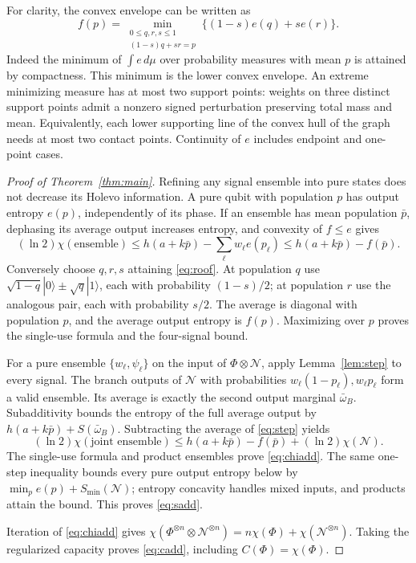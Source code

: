 \documentclass[11pt]{article}
\newcommand{\Smin}{S_{\min}}
\begin{document}
For clarity, the convex envelope can be written as
\begin{equation}\label{eq:roof}
 f(p)=\min_{\substack{0\le q,r,s\le1\\(1-s)q+sr=p}}
       \{(1-s)e(q)+se(r)\}.
\end{equation}
Indeed the minimum of $\int e\,d\mu$ over probability measures with mean $p$ is attained by compactness. This minimum is the lower convex envelope. An extreme minimizing measure has at most two support points: weights on three distinct support points admit a nonzero signed perturbation preserving total mass and mean. Equivalently, each lower supporting line of the convex hull of the graph needs at most two contact points. Continuity of $e$ includes endpoint and one-point cases.

\begin{proof}[Proof of Theorem~\ref{thm:main}]
Refining any signal ensemble into pure states does not decrease its Holevo information. A pure qubit with population $p$ has output entropy $e(p)$, independently of its phase. If an ensemble has mean population $\bar p$, dephasing its average output increases entropy, and convexity of $f\le e$ gives
\[
 (\ln2)\chi(\text{ensemble})
 \le h(a+k\bar p)-\sum_\ell w_\ell e(p_\ell)
 \le h(a+k\bar p)-f(\bar p).
\]
Conversely choose $q,r,s$ attaining \eqref{eq:roof}. At population $q$ use
$\sqrt{1-q}|0\rangle\pm\sqrt q|1\rangle$, each with probability $(1-s)/2$; at population $r$ use the analogous pair, each with probability $s/2$. The average is diagonal with population $p$, and the average output entropy is $f(p)$. Maximizing over $p$ proves the single-use formula and the four-signal bound.

For a pure ensemble $\{w_\ell,\psi_\ell\}$ on the input of $\Phi\otimes\mathcal N$, apply Lemma~\ref{lem:step} to every signal. The branch outputs of $\mathcal N$ with probabilities
$w_\ell(1-p_\ell),w_\ell p_\ell$ form a valid ensemble. Its average is exactly the second output marginal $\bar\omega_B$. Subadditivity bounds the entropy of the full average output by
$h(a+k\bar p)+S(\bar\omega_B)$. Subtracting the average of \eqref{eq:step} yields
\[
 (\ln2)\chi(\text{joint ensemble})
 \le h(a+k\bar p)-f(\bar p)+(\ln2)\chi(\mathcal N).
\]
The single-use formula and product ensembles prove \eqref{eq:chiadd}. The same one-step inequality bounds every pure output entropy below by
$\min_p e(p)+\Smin(\mathcal N)$; entropy concavity handles mixed inputs, and products attain the bound. This proves \eqref{eq:sadd}.

Iteration of \eqref{eq:chiadd} gives
$\chi(\Phi^{\otimes n}\otimes\mathcal N^{\otimes n})
=n\chi(\Phi)+\chi(\mathcal N^{\otimes n})$.
Taking the regularized capacity proves \eqref{eq:cadd}, including $C(\Phi)=\chi(\Phi)$.
\end{proof}
\end{document}

